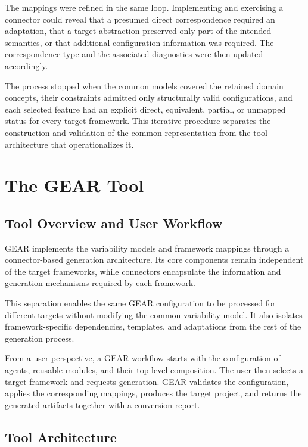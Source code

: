 The mappings were refined in the same loop. Implementing and exercising a
connector could reveal that a presumed direct correspondence required an
adaptation, that a target abstraction preserved only part of the intended
semantics, or that additional configuration information was required. The
correspondence type and the associated diagnostics were then updated
accordingly.

The process stopped when the common models covered the retained domain
concepts, their constraints admitted only structurally valid configurations,
and each selected feature had an explicit direct, equivalent, partial, or
unmapped status for every target framework. This iterative procedure separates
the construction and validation of the common representation from the tool
architecture that operationalizes it.

\section{The GEAR Tool}
\label{sec:gear-tool}
\label{subsec:gear-architecture-generation}

\subsection{Tool Overview and User Workflow}
\label{subsec:tool-overview-workflow}

GEAR implements the variability models and framework mappings through a
connector-based generation architecture. Its core components remain independent
of the target frameworks, while connectors encapsulate the information and
generation mechanisms required by each framework.

This separation enables the same GEAR configuration to be processed for
different targets without modifying the common variability model. It also
isolates framework-specific dependencies, templates, and adaptations from the
rest of the generation process.

From a user perspective, a GEAR workflow starts with the configuration of
agents, reusable modules, and their top-level composition. The user then selects
a target framework and requests generation. GEAR validates the configuration,
applies the corresponding mappings, produces the target project, and returns
the generated artifacts together with a conversion report.

\subsection{Tool Architecture}
\label{subsec:tool-architecture}

